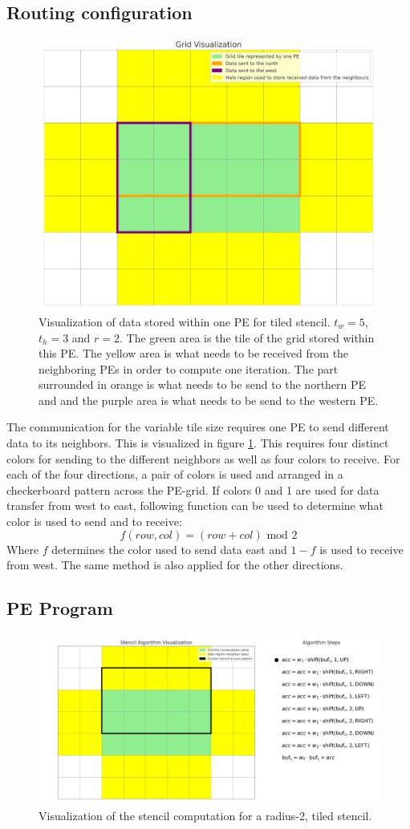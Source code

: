\documentclass{article}
\newcommand{\m}{\text{ mod }}
\begin{document}
\subsection{Routing configuration}
\begin{figure}
    \centering
    \includegraphics[width=0.5\linewidth]{plots/grid_visualization.png}
    \caption{Visualization of data stored within one PE for tiled stencil. $t_w=5$, $t_h=3$ and $r=2$. The green area is the tile of the grid stored within this PE. The yellow area is what needs to be received from the neighboring PEs in order to compute one iteration. The part surrounded in orange is what needs to be send to the northern PE and and the purple area is what needs to be send to the western PE.}
    \label{fig:grid_visualization}
\end{figure}
The communication for the variable tile size requires one PE to send different data to its neighbors. This is visualized in figure \ref{fig:grid_visualization}. This requires four distinct colors for sending to the different neighbors as well as four colors to receive. For each of the four directions, a pair of colors is used and arranged in a checkerboard pattern across the PE-grid.
If colors 0 and 1 are used for data transfer from west to east, following function can be used to determine what color is used to send and to receive:
\begin{equation}
    \label{eq:tiled_coloring_function}
    f(row, col)=(row+col)\m2
\end{equation}
Where $f$ determines the color used to send data east and $1-f$ is used to receive from west. The same method is also applied for the other directions.
\subsection{PE Program}

\begin{figure}
    \centering
    \includegraphics[width=0.5\linewidth]{plots/stencil_algorithm_animation.gif}
    \caption{Visualization of the stencil computation for a radius-2, tiled stencil.}
    \label{fig:stencil_algorithm_animation}
\end{figure}
\end{document}
